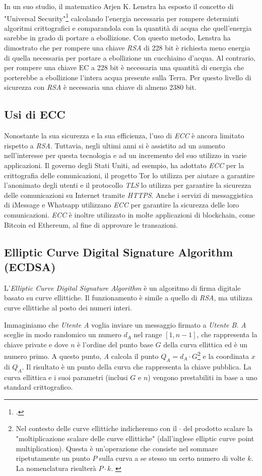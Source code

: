 In un suo studio, il matematico Arjen K. Lenstra ha esposto il concetto di "Universal Security"\footcite{site:universal-security} calcolando l'energia necessaria per rompere determinti algoritmi crittografici e comparandola con la quantità di acqua che quell'energia sarebbe in grado di portare a ebollizione.
Con questo metodo, Lenstra ha dimostrato che per rompere una chiave \emph{RSA} di 228 bit è richiesta meno energia di quella necessaria per portare a ebollizione un cucchiaino d'acqua.
Al contrario, per rompere una chiave EC a 228 bit è necessaria una quantità di energia che porterebbe a ebollizione l'intera acqua presente sulla Terra.
Per questo livello di sicurezza con \emph{RSA} è necessaria una chiave di almeno 2380 bit.

\subsection{Usi di ECC}
Nonostante la sua sicurezza e la sua efficienza, l'uso di \emph{ECC} è ancora limitato rispetto a \emph{RSA}.
Tuttavia, negli ultimi anni si è assistito ad un aumento nell'interesse per questa tecnologia e ad un incremento del suo utilizzo in varie applicazioni.
Il governo degli Stati Uniti, ad esempio, ha adottato \emph{ECC} per la crittografia delle comunicazioni, il progetto Tor lo utilizza per aiutare a garantire l'anonimato degli utenti e il protocollo \emph{\gls{TLS}} lo utilizza per garantire la sicurezza delle comunicazioni su Internet tramite \emph{\gls{HTTPS}}.
Anche i servizi di messaggistica di iMessage e Whatsapp utilizzano \emph{ECC} per garantire la sicurezza delle loro comunicazioni.
\emph{ECC} è inoltre utilizzato in molte applicazioni di blockchain, come Bitcoin ed Ethereum, al fine di approvare le transazioni.

\subsection{Elliptic Curve Digital Signature Algorithm (ECDSA)}
\label{sec:ecdsa}

L'\emph{Elliptic Curve Digital Signature Algorithm} è un algoritmo di firma digitale basato su curve ellittiche.
Il funzionamento è simile a quello di \emph{RSA}, ma utilizza curve ellittiche al posto dei numeri interi.

Immaginiamo che \emph{Utente A} voglia inviare un messaggio firmato a \emph{Utente B}.
\emph{A} sceglie in modo randomico un numero $d_A$ nel range $[1, n-1]$, che rappresenta la chiave private e dove $n$ è l'ordine del punto base $G$ della curva ellittica ed è un numero primo.
A questo punto, \emph{A} calcola il punto $Q_A = d_A \cdot G$\footnote{Nel contesto delle curve ellittiche indicheremo con il $\cdot$ del prodotto scalare la "moltiplicazione scalare delle curve ellittiche" (dall'inglese elliptic curve point multiplication). Questa è un'operazione che consiste nel sommare ripetutamente un punto $P$ sulla curva a se stesso un certo numero di volte $k$. La nomenclatura risulterà $P \cdot k$. \cite{site:ec-point-multiplication}} e la coordinata $x$ di $Q_A$. Il risultato è un punto della curva che rappresenta la chiave pubblica.
La curva ellittica e i suoi parametri (inclusi $G$ e $n$) vengono prestabiliti in base a uno standard crittografico.

